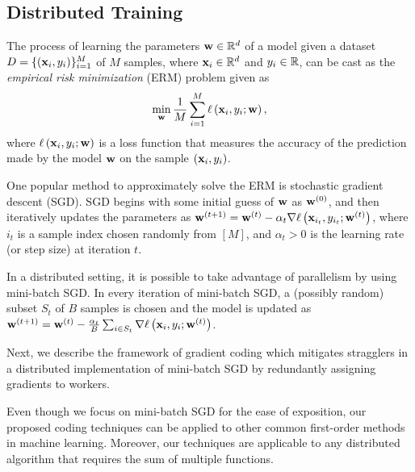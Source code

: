 \documentclass[conference,letterpaper]{IEEEtran}
\begin{document}
\subsection{Distributed Training}
\label{sec:training}
The process of learning the parameters $\mathbf{w}\in\mathbb{R}^d$ of a model given a dataset $D = \{(\mathbf{x}_i,y_i)\}_{i=1}^{M}$ of $M$ samples, where $\mathbf{x}_i \in \mathbb{R}^d$ and $y_i\in \mathbb{R}$, can be cast as the {\it empirical risk minimization} (ERM) problem given as %
 \begin{equation}
 \label{eq:objective}
 \min_{\mathbf{w}} \frac{1}{M}\sum_{i=1}^{M} \ell\left(\mathbf{x}_i,y_i;\mathbf{w}\right),
 \end{equation}
where $\ell\left(\mathbf{x}_i,y_i;\mathbf{w}\right)$ is a loss function that measures the accuracy of the prediction made by the model $\mathbf{w}$ on the sample $(\mathbf{x}_i,y_i)$. 

One popular method to approximately solve the ERM is stochastic gradient descent (SGD). SGD begins with some initial guess of $\mathbf{w}$ as $\mathbf{w}^{(0)}$, and then iteratively updates the parameters as $\mathbf{w}^{(t+1)} = \mathbf{w}^{(t)} - \alpha_t \nabla\ell\left(\mathbf{x}_{i_t},y_{i_t};\mathbf{w}^{(t)}\right)$, where $i_t$ is a  sample index chosen randomly from $[M]$, and  $\alpha_t > 0$ is the learning rate (or step size) at iteration $t$.

In a distributed setting, it is possible to take advantage of parallelism by using mini-batch SGD. In every iteration of mini-batch SGD, a (possibly random) subset $S_t$ of $B$ samples is chosen and the model is updated as \mbox{$\mathbf{w}^{(t+1)} = \mathbf{w}^{(t)} - \frac{\alpha_t}{B}\sum_{i\in S_t} \nabla\ell\left(\mathbf{x}_i,y_i;\mathbf{w}^{(t)}\right)$.}

Next, we describe the framework of gradient coding which mitigates stragglers in a distributed implementation of mini-batch SGD by redundantly assigning gradients to workers.

 \begin{remark}
 \label{rem:SGD-vs-others}
 Even though we focus on mini-batch SGD for the ease of exposition, our proposed coding techniques can be applied to other common first-order methods in machine learning. Moreover, our techniques are applicable to any distributed algorithm that requires the sum of multiple functions.  %
 \end{remark}
\end{document}
